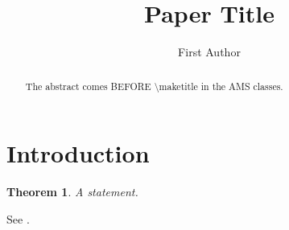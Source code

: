 \documentclass{amsart}
\newtheorem{theorem}{Theorem}[section]
\begin{document}
\title{Paper Title}
\author{First Author}
\address{Department, University, City, Country}
\begin{abstract}
The abstract comes BEFORE \textbackslash maketitle in the AMS classes.
\end{abstract}
\maketitle
\section{Introduction}
\begin{theorem}\label{thm:main} A statement.\end{theorem}
See \cite{knuth1984literate}.


\end{document}
